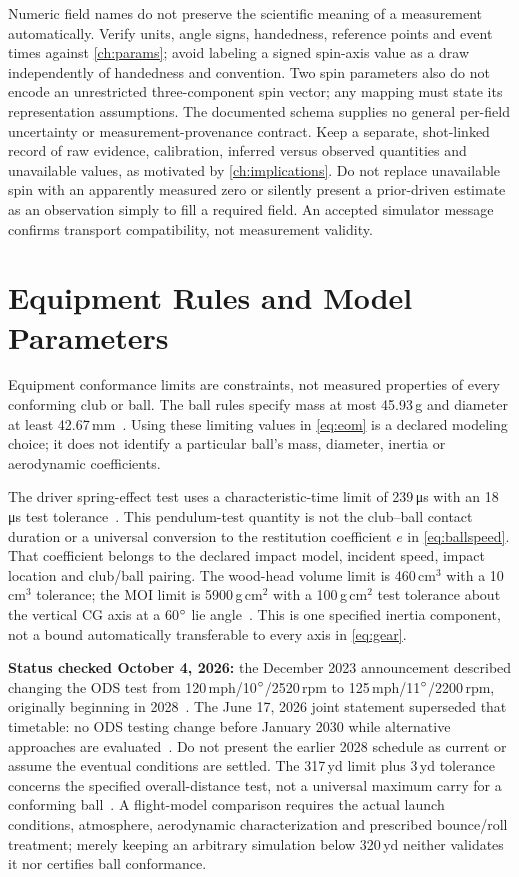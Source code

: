 Numeric field names do not preserve the scientific meaning of a measurement automatically.
Verify units, angle signs, handedness, reference points and event times against \cref{ch:params}; avoid labeling a signed spin-axis value as a draw independently of handedness and convention.
Two spin parameters also do not encode an unrestricted three-component spin vector; any mapping must state its representation assumptions.
The documented schema supplies no general per-field uncertainty or measurement-provenance contract.
Keep a separate, shot-linked record of raw evidence, calibration, inferred versus observed quantities and unavailable values, as motivated by \cref{ch:implications}.
Do not replace unavailable spin with an apparently measured zero or silently present a prior-driven estimate as an observation simply to fill a required field.
An accepted simulator message confirms transport compatibility, not measurement validity.

\section{Equipment Rules and Model Parameters}

Equipment conformance limits are constraints, not measured properties of every conforming club or ball.
The ball rules specify mass at most 45.93\,g and diameter at least 42.67\,mm~\cite{randaballrules}.
Using these limiting values in \cref{eq:eom} is a declared modeling choice; it does not identify a particular ball's mass, diameter, inertia or aerodynamic coefficients.

The driver spring-effect test uses a characteristic-time limit of 239\,\si{\micro\second} with an 18\,\si{\micro\second} test tolerance~\cite{usgactnotice}.
This pendulum-test quantity is not the club--ball contact duration or a universal conversion to the restitution coefficient $e$ in \cref{eq:ballspeed}.
That coefficient belongs to the declared impact model, incident speed, impact location and club/ball pairing.
The wood-head volume limit is 460\,cm$^3$ with a 10\,cm$^3$ tolerance; the MOI limit is 5900\,g\,cm$^2$ with a 100\,g\,cm$^2$ test tolerance about the vertical CG axis at a 60$\si{\degree}$ lie angle~\cite{randaclubrules}.
This is one specified inertia component, not a bound automatically transferable to every axis in \cref{eq:gear}.

\textbf{Status checked October 4, 2026:} the December 2023 announcement described changing the ODS test from 120\,mph/10$\si{\degree}$/2520\,rpm to 125\,mph/11$\si{\degree}$/2200\,rpm, originally beginning in 2028~\cite{usgaods2023}.
The June 17, 2026 joint statement superseded that timetable: no ODS testing change before January 2030 while alternative approaches are evaluated~\cite{usgaods2026}.
Do not present the earlier 2028 schedule as current or assume the eventual conditions are settled.
The 317\,yd limit plus 3\,yd tolerance concerns the specified overall-distance test, not a universal maximum carry for a conforming ball~\cite{randaballrules}.
A flight-model comparison requires the actual launch conditions, atmosphere, aerodynamic characterization and prescribed bounce/roll treatment; merely keeping an arbitrary simulation below 320\,yd neither validates it nor certifies ball conformance.

